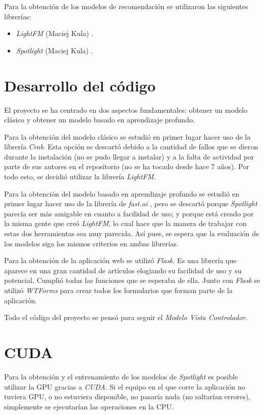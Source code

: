 Para la obtención de los modelos de recomendación se utilizaron las siguientes librerías:
\begin{itemize}
\tightlist
\item
	\emph{LightFM} (Maciej Kula) \cite{kulalightfm}.
\item
	\emph{Spotlight} (Maciej Kula) \cite{kula2017spotlight}.
\end{itemize}

\section{Desarrollo del código}\label{desarrollo-codigo}
El proyecto se ha centrado en dos aspectos fundamentales: obtener un modelo clásico y obtener un modelo basado en aprendizaje profundo.

Para la obtención del modelo clásico se estudió en primer lugar hacer uso de la librería \textit{Crab}. Esta opción se descartó debido a la cantidad de fallos que se dieron durante la instalación (no se pudo llegar a instalar) y a la falta de actividad por parte de sus autores en el repositorio (no se ha tocado desde hace 7 años). Por todo esto, se decidió utilizar la librería \textit{LightFM}.

Para la obtención del modelo basado en aprendizaje profundo se estudió en primer lugar hacer uso de la librería de \textit{fast.ai} \cite{fastai}, pero se descartó porque \textit{Spotlight} parecía ser más amigable en cuanto a facilidad de uso; y porque está creado por la misma gente que creó \textit{LightFM}, lo cual hace que la manera de trabajar con estas dos herramientas sea muy parecida. Así pues, se espera que la evaluación de los modelos siga los mismos criterios en ambas librerías.

Para la obtención de la aplicación web se utilizó \textit{Flask}. Es una librería que aparece en una gran cantidad de artículos elogiando su facilidad de uso y su potencial. Cumplió todas las funciones que se esperaba de ella. Junto con \textit{Flask} se utilizó \textit{WTForms} para crear todos los formularios que forman parte de la aplicación.

Todo el código del proyecto se pensó para seguir el \textit{Modelo Vista Controlador}.

\section{CUDA}\label{cuda}
Para la obtención y el entrenamiento de los modelos de \textit{Spotlight} es posible utilizar la GPU gracias a \textit{CUDA}. Si el equipo en el que corre la aplicación no tuviera GPU, o no estuviera disponible, no pasaría nada (no saltarían errores), simplemente se ejecutarían las operaciones en la CPU.

